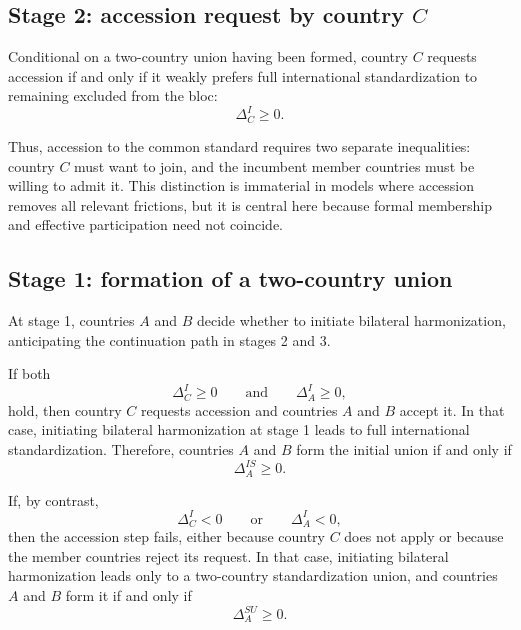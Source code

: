 \subsection{Stage 2: accession request by country \texorpdfstring{$C$}{C}}

Conditional on a two-country union having been formed, country $C$ requests accession if and only if it weakly prefers full international standardization to remaining excluded from the bloc:
\begin{equation}
\Delta_C^I \ge 0.
\label{eq:join_rule_main}
\end{equation}

Thus, accession to the common standard requires two separate inequalities: country $C$ must want to join, and the incumbent member countries must be willing to admit it. This distinction is immaterial in models where accession removes all relevant frictions, but it is central here because formal membership and effective participation need not coincide.

\subsection{Stage 1: formation of a two-country union}

At stage 1, countries $A$ and $B$ decide whether to initiate bilateral harmonization, anticipating the continuation path in stages 2 and 3.

If both
\begin{equation}
\Delta_C^I \ge 0
\qquad\text{and}\qquad
\Delta_A^I \ge 0,
\label{eq:is_path_main}
\end{equation}
hold, then country $C$ requests accession and countries $A$ and $B$ accept it. In that case, initiating bilateral harmonization at stage 1 leads to full international standardization. Therefore, countries $A$ and $B$ form the initial union if and only if
\begin{equation}
\Delta_A^{IS} \ge 0.
\label{eq:form_is_main}
\end{equation}

If, by contrast,
\begin{equation}
\Delta_C^I < 0
\qquad\text{or}\qquad
\Delta_A^I < 0,
\label{eq:su_path_main}
\end{equation}
then the accession step fails, either because country $C$ does not apply or because the member countries reject its request. In that case, initiating bilateral harmonization leads only to a two-country standardization union, and countries $A$ and $B$ form it if and only if
\begin{equation}
\Delta_A^{SU} \ge 0.
\label{eq:form_su_main}
\end{equation}

